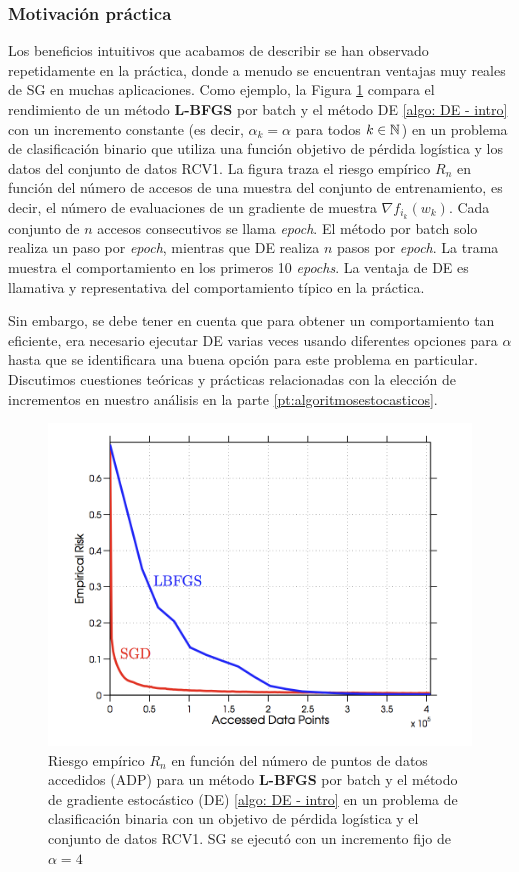 \subsubsection{Motivación práctica}

Los beneficios intuitivos que acabamos de describir se han observado repetidamente en la práctica, donde a menudo se encuentran ventajas muy reales de SG en muchas aplicaciones. Como ejemplo, la Figura \ref{gfx: de} compara el rendimiento de un método \textbf{L-BFGS} por batch \cite{liu:1989} \cite{nocedal:1980} y el método DE \ref{algo: DE - intro} con un incremento constante (es decir, $\alpha_k = \alpha$ para todos $k \in {\mathbb{N}}$) en un problema de clasificación binario que utiliza una función objetivo de pérdida logística y los datos del conjunto de datos RCV1. La figura traza el riesgo empírico $R_n$ en función del número de accesos de una muestra del conjunto de entrenamiento, es decir, el número de evaluaciones de un gradiente de muestra $\nabla f_{i_k}(w_k)$. Cada conjunto de $n$ accesos consecutivos se llama \textit{epoch}. El método por batch solo realiza un paso por \textit{epoch}, mientras que DE realiza $n$ pasos por \textit{epoch}. La trama muestra el comportamiento en los primeros 10 \textit{epochs}. La ventaja de DE es llamativa y representativa del comportamiento típico en la práctica. 

Sin embargo, se debe tener en cuenta que para obtener un comportamiento tan eficiente, era necesario ejecutar DE varias veces usando diferentes opciones para $\alpha$ hasta que se identificara una buena opción para este problema en particular. Discutimos cuestiones teóricas y prácticas relacionadas con la elección de incrementos en nuestro análisis en la parte \ref{pt:algoritmosestocasticos}.


\begin{figure}[h]
	\centering
	\includegraphics[scale=.3]{gfx/de.png}
	\caption{Riesgo empírico $R_n$ en función del número de puntos de datos accedidos (ADP) para un método \textbf{L-BFGS} por batch y el método de gradiente estocástico (DE) \ref{algo: DE - intro} en un problema de clasificación binaria con un objetivo de pérdida logística y el conjunto de datos RCV1. SG se ejecutó con un incremento fijo de $\alpha  = 4$}
	\label{gfx: de}
\end{figure}

